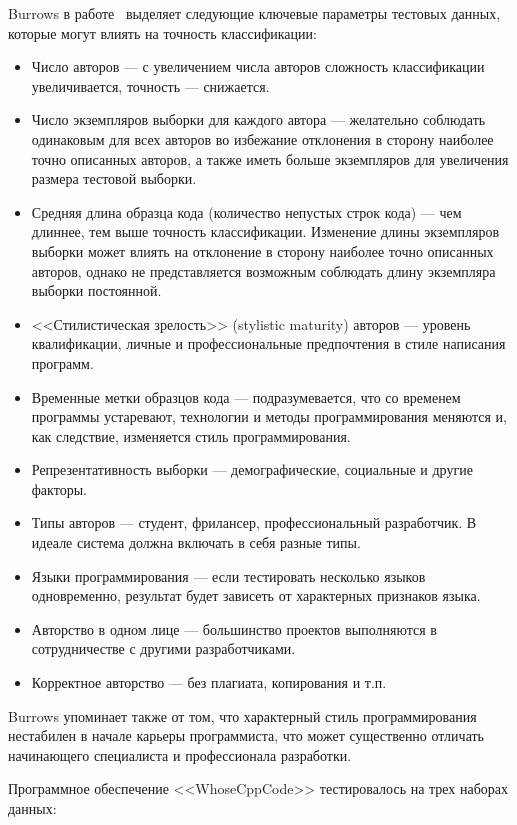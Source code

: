 Burrows в работе~\cite{burrows_big} выделяет следующие ключевые параметры тестовых данных,
которые могут влиять на точность классификации:

\begin{itemize}
 \item Число авторов --- с увеличением числа авторов сложность классификации увеличивается, 
 точность --- снижается.
 \item Число экземпляров выборки для каждого автора --- желательно соблюдать одинаковым для всех авторов во 
 избежание отклонения в сторону наиболее точно описанных авторов, а также иметь больше экземпляров 
 для увеличения размера тестовой выборки. 
 \item Средняя длина образца кода (количество непустых строк кода) --- чем длиннее, тем выше точность
 классификации. Изменение длины экземпляров выборки может влиять на отклонение в сторону наиболее 
 точно описанных авторов, однако не представляется возможным соблюдать длину экземпляра выборки постоянной.
 \item <<Стилистическая зрелость>> (stylistic maturity) авторов --- уровень квалификации, 
 личные и профессиональные предпочтения в стиле написания программ.
 \item Временные метки образцов кода --- подразумевается, что со временем программы устаревают, технологии
 и методы программирования меняются и, как следствие, изменяется стиль программирования.
 \item Репрезентативность выборки --- демографические, социальные и другие факторы.
 \item Типы авторов --- студент, фрилансер, профессиональный разработчик. 
 В идеале система должна включать в себя разные типы.
 \item Языки программирования --- если тестировать несколько языков одновременно, 
 результат будет зависеть от характерных признаков языка.
 \item Авторство в одном лице --- большинство проектов выполняются в 
 сотрудничестве с другими разработчиками.
 \item Корректное авторство --- без плагиата, копирования и т.п.
\end{itemize}

Burrows упоминает также от том, что характерный стиль программирования нестабилен в начале карьеры программиста,
что может существенно отличать начинающего специалиста и профессионала разработки.

Программное обеспечение <<WhoseCppCode>> тестировалось на трех наборах данных:


